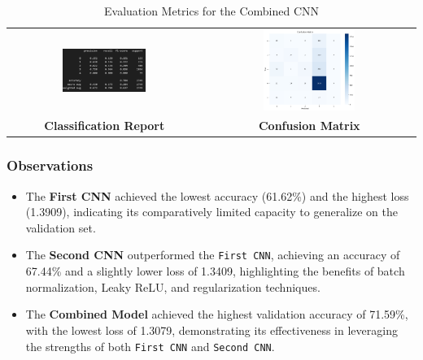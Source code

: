 \documentclass{article}
\begin{document}
\vspace{1cm}
\begin{table}[h!]
    \centering
    \begin{tabular}{cc}
        \includegraphics[width=0.45\textwidth]{CombinedCNN.png} &
        \includegraphics[width=0.45\textwidth]{combined_cnn_cf.png} \\
        \multicolumn{1}{c}{\textbf{Classification Report}} &
        \multicolumn{1}{c}{\textbf{Confusion Matrix}} \\
    \end{tabular}
    \caption{Evaluation Metrics for the Combined CNN}
    \label{tab:combined_cnn_metrics}
\end{table}

\subsubsection{Observations}

\begin{itemize}
    \item The \textbf{First CNN} achieved the lowest accuracy (61.62\%) and the highest loss (1.3909), indicating its comparatively limited capacity to generalize on the validation set.
    \item The \textbf{Second CNN} outperformed the \texttt{First CNN}, achieving an accuracy of 67.44\% and a slightly lower loss of 1.3409, highlighting the benefits of batch normalization, Leaky ReLU, and regularization techniques.
    \item The \textbf{Combined Model} achieved the highest validation accuracy of 71.59\%, with the lowest loss of 1.3079, demonstrating its effectiveness in leveraging the strengths of both \texttt{First CNN} and \texttt{Second CNN}.
\end{itemize}
\end{document}
